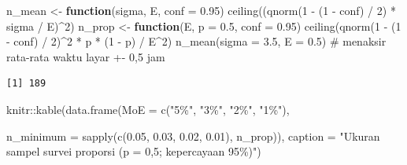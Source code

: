 \documentclass[
  indonesian,
  letterpaper,
]{book}
\newenvironment{Shaded}{\begin{snugshade}}{\end{snugshade}}
\newcommand{\AttributeTok}[1]{\textcolor[rgb]{0.40,0.45,0.13}{#1}}
\newcommand{\CommentTok}[1]{\textcolor[rgb]{0.37,0.37,0.37}{#1}}
\newcommand{\ControlFlowTok}[1]{\textcolor[rgb]{0.00,0.23,0.31}{\textbf{#1}}}
\newcommand{\DecValTok}[1]{\textcolor[rgb]{0.68,0.00,0.00}{#1}}
\newcommand{\FloatTok}[1]{\textcolor[rgb]{0.68,0.00,0.00}{#1}}
\newcommand{\FunctionTok}[1]{\textcolor[rgb]{0.28,0.35,0.67}{#1}}
\newcommand{\NormalTok}[1]{\textcolor[rgb]{0.00,0.23,0.31}{#1}}
\newcommand{\OtherTok}[1]{\textcolor[rgb]{0.00,0.23,0.31}{#1}}
\newcommand{\SpecialCharTok}[1]{\textcolor[rgb]{0.37,0.37,0.37}{#1}}
\newcommand{\StringTok}[1]{\textcolor[rgb]{0.13,0.47,0.30}{#1}}
\begin{document}
\begin{Shaded}
\begin{Highlighting}[]
\NormalTok{n\_mean }\OtherTok{\textless{}{-}} \ControlFlowTok{function}\NormalTok{(sigma, E, }\AttributeTok{conf =} \FloatTok{0.95}\NormalTok{) }\FunctionTok{ceiling}\NormalTok{((}\FunctionTok{qnorm}\NormalTok{(}\DecValTok{1} \SpecialCharTok{{-}}\NormalTok{ (}\DecValTok{1} \SpecialCharTok{{-}}\NormalTok{ conf) }\SpecialCharTok{/} \DecValTok{2}\NormalTok{) }\SpecialCharTok{*}\NormalTok{ sigma }\SpecialCharTok{/}\NormalTok{ E)}\SpecialCharTok{\^{}}\DecValTok{2}\NormalTok{)}
\NormalTok{n\_prop }\OtherTok{\textless{}{-}} \ControlFlowTok{function}\NormalTok{(E, }\AttributeTok{p =} \FloatTok{0.5}\NormalTok{, }\AttributeTok{conf =} \FloatTok{0.95}\NormalTok{) }\FunctionTok{ceiling}\NormalTok{(}\FunctionTok{qnorm}\NormalTok{(}\DecValTok{1} \SpecialCharTok{{-}}\NormalTok{ (}\DecValTok{1} \SpecialCharTok{{-}}\NormalTok{ conf) }\SpecialCharTok{/} \DecValTok{2}\NormalTok{)}\SpecialCharTok{\^{}}\DecValTok{2} \SpecialCharTok{*}\NormalTok{ p }\SpecialCharTok{*}\NormalTok{ (}\DecValTok{1} \SpecialCharTok{{-}}\NormalTok{ p) }\SpecialCharTok{/}\NormalTok{ E}\SpecialCharTok{\^{}}\DecValTok{2}\NormalTok{)}
\FunctionTok{n\_mean}\NormalTok{(}\AttributeTok{sigma =} \FloatTok{3.5}\NormalTok{, }\AttributeTok{E =} \FloatTok{0.5}\NormalTok{) }\CommentTok{\# menaksir rata{-}rata waktu layar +{-} 0,5 jam}
\end{Highlighting}
\end{Shaded}

\begin{verbatim}
[1] 189
\end{verbatim}

\begin{Shaded}
\begin{Highlighting}[]
\NormalTok{knitr}\SpecialCharTok{::}\FunctionTok{kable}\NormalTok{(}\FunctionTok{data.frame}\NormalTok{(}\AttributeTok{MoE =} \FunctionTok{c}\NormalTok{(}\StringTok{"5\%"}\NormalTok{, }\StringTok{"3\%"}\NormalTok{, }\StringTok{"2\%"}\NormalTok{, }\StringTok{"1\%"}\NormalTok{),}

\AttributeTok{n\_minimum =} \FunctionTok{sapply}\NormalTok{(}\FunctionTok{c}\NormalTok{(}\FloatTok{0.05}\NormalTok{, }\FloatTok{0.03}\NormalTok{, }\FloatTok{0.02}\NormalTok{, }\FloatTok{0.01}\NormalTok{), n\_prop)),}
\AttributeTok{caption =} \StringTok{"Ukuran sampel survei proporsi (p = 0,5; kepercayaan 95\%)"}\NormalTok{)}
\end{Highlighting}
\end{Shaded}
\end{document}
